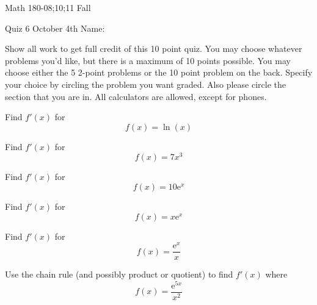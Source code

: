\documentclass[11pt,epsfig]{article}
\begin{document}
Math 180-08;10;11 Fall

Quiz 6 October 4th \hspace{1.9in} {Name:} {\underline {\hspace{2.5in}}}
\vspace{2pc}

Show all work to get full credit of this 10 point quiz. You may choose whatever problems you'd like, but there is a maximum of 10 points possible. You may choose either the 5 2-point problems or the 10 point problem on the back. Specify your choice by circling the problem you want graded. Also please circle the section that you are in. All calculators are allowed, except for phones.
\vspace{2pc}

\begin{problem}{2}
Find $f'(x)$ for
\begin{equation*}
f(x) = \ln (x)
\end{equation*}
\vfill
\end{problem}

\begin{problem}{2}
Find $f'(x)$ for
\begin{equation*}
f(x) = 7x^3
\end{equation*}
\vfill
\end{problem}

\begin{problem}{2}
Find $f'(x)$ for
\begin{equation*}
f(x) = 10 \mathrm{e}^x
\end{equation*}
\vfill
\end{problem}

\begin{problem}{2}
Find $f'(x)$ for
\begin{equation*}
f(x) = x \mathrm{e}^x
\end{equation*}
\vfill
\end{problem}

\begin{problem}{2}
Find $f'(x)$ for
\begin{equation*}
f(x) = \frac{\mathrm{e}^x}{x}
\end{equation*}
\vfill
\end{problem}




\newpage

\begin{problem}{10}
Use the chain rule (and possibly product or quotient) to find $f'(x)$ where
\begin{equation*}
f(x) = \frac{\mathrm{e}^{5x}}{x^2}
\end{equation*}
\vfill
\end{problem}





\showpoints
\end{document}
